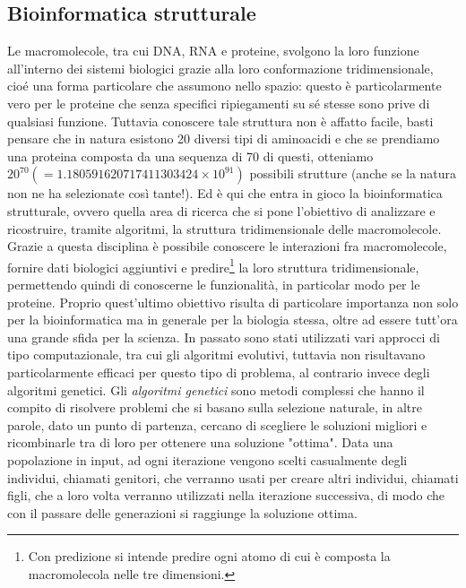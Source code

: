 \subsection{Bioinformatica strutturale}
Le macromolecole, tra cui DNA, RNA e proteine, svolgono la loro funzione all'interno dei sistemi biologici grazie alla loro conformazione tridimensionale, cioé una forma particolare che assumono nello spazio: questo è particolarmente vero per le proteine che senza specifici ripiegamenti su sé stesse sono prive di qualsiasi funzione. Tuttavia conoscere tale struttura non è affatto facile, basti pensare che in natura esistono 20 diversi tipi di aminoacidi e che se prendiamo una proteina composta da una sequenza di 70 di questi, otteniamo $20^{70}(=1.180591620717411303424\times{10^{91}})$ possibili strutture (anche se la natura non ne ha selezionate  così tante!). Ed è qui che entra in gioco la bioinformatica strutturale, ovvero quella area di ricerca che si pone l'obiettivo di analizzare e ricostruire, tramite algoritmi, la struttura tridimensionale delle macromolecole.
\newline
Grazie a questa disciplina è possibile conoscere le interazioni fra macromolecole, fornire dati biologici aggiuntivi e predire\footnote{Con predizione si intende predire ogni atomo di cui è composta la macromolecola nelle tre dimensioni.} la loro struttura tridimensionale, permettendo quindi di conoscerne le funzionalità, in particolar modo per le proteine. Proprio quest'ultimo obiettivo risulta di particolare importanza non solo per la bioinformatica ma in generale per la biologia stessa, oltre ad essere tutt'ora una grande sfida per la scienza.
\newline
In passato sono stati utilizzati vari approcci di tipo computazionale, tra cui gli algoritmi evolutivi, tuttavia non risultavano particolarmente efficaci per questo tipo di problema, al contrario invece degli algoritmi genetici.
\newline
Gli \textit{algoritmi genetici} sono metodi complessi che hanno il compito di risolvere problemi che si basano sulla selezione naturale, in altre parole, dato un punto di partenza, cercano di scegliere le soluzioni migliori e ricombinarle tra di loro per ottenere una soluzione "ottima". Data una popolazione in input, ad ogni iterazione vengono scelti casualmente degli individui, chiamati genitori, che verranno usati per creare altri individui, chiamati figli, che a loro volta verranno utilizzati nella iterazione successiva, di modo che con il passare delle generazioni si raggiunge la soluzione ottima.
